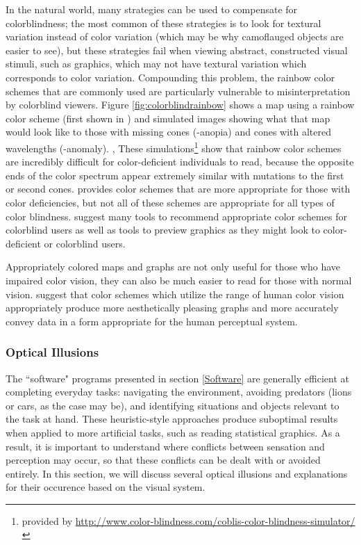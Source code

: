 \documentclass[11pt]{isuthesis}\usepackage[]{graphicx}\usepackage[]{color}
\begin{document}
In the natural world, many strategies can be used to compensate for colorblindness; the most common of these strategies is to look for textural variation instead of color variation (which may be why camoflauged objects are easier to see), but these strategies fail when viewing abstract, constructed visual stimuli, such as graphics, which may not have textural variation which corresponds to color variation. Compounding this problem, the rainbow color schemes that are commonly used are particularly vulnerable to misinterpretation by colorblind viewers. Figure \ref{fig:colorblindrainbow} shows a map using a rainbow color scheme (first shown in \citet{light2004end}) and simulated images showing what that map would look like to those with missing cones (-anopia) and cones with altered wavelengths (-anomaly). , These simulations\footnote{provided by \url{http://www.color-blindness.com/coblis-color-blindness-simulator/}} show that rainbow color schemes are incredibly difficult for color-deficient individuals to read, because the opposite ends of the color spectrum appear extremely similar with mutations to the first or second cones. \citet{light2004end} provides color schemes that are more appropriate for those with color deficiencies, but not all of these schemes are appropriate for all types of color blindness. \citet{silva2011using} suggest many tools to recommend appropriate color schemes for colorblind users as well as tools to preview graphics as they might look to color-deficient or colorblind users. 

Appropriately colored maps and graphs are not only useful for those who have impaired color vision, they can also be much easier to read for those with normal vision. \citet{rainbowcolor} suggest that color schemes which utilize the range of human color vision appropriately produce more aesthetically pleasing graphs and more accurately convey data in a form appropriate for the human perceptual system. 

\subsubsection{Optical Illusions}
The ``software" programs presented in section \ref{Software} are generally efficient at completing everyday tasks: navigating the environment, avoiding predators (lions or cars, as the case may be), and identifying situations and objects relevant to the task at hand. These heuristic-style approaches produce suboptimal results when applied to more artificial tasks, such as reading statistical graphics. As a result, it is important to understand where conflicts between sensation and perception may occur, so that these conflicts can be dealt with or avoided entirely. In this section, we will discuss several optical illusions and explanations for their occurence based on the visual system.
\end{document}
